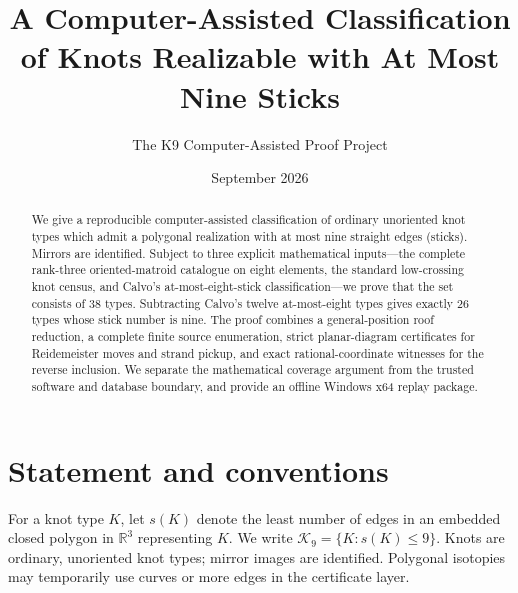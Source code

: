 \documentclass[11pt]{article}
\title{A Computer-Assisted Classification of Knots Realizable with At Most Nine Sticks}
\author{The K9 Computer-Assisted Proof Project}
\date{September 2026}
\newcommand{\K}{\mathcal K}
\begin{document}
\maketitle
\begin{abstract}
We give a reproducible computer-assisted classification of ordinary unoriented knot types which admit a polygonal realization with at most nine straight edges (sticks). Mirrors are identified. Subject to three explicit mathematical inputs---the complete rank-three oriented-matroid catalogue on eight elements, the standard low-crossing knot census, and Calvo's at-most-eight-stick classification---we prove that the set consists of 38 types. Subtracting Calvo's twelve at-most-eight types gives exactly 26 types whose stick number is nine. The proof combines a general-position roof reduction, a complete finite source enumeration, strict planar-diagram certificates for Reidemeister moves and strand pickup, and exact rational-coordinate witnesses for the reverse inclusion. We separate the mathematical coverage argument from the trusted software and database boundary, and provide an offline Windows x64 replay package.
\end{abstract}
\section{Statement and conventions}
For a knot type $K$, let $s(K)$ denote the least number of edges in an embedded closed polygon in $\mathbb R^3$ representing $K$. We write $\K_9=\{K:s(K)\leq9\}$. Knots are ordinary, unoriented knot types; mirror images are identified. Polygonal isotopies may temporarily use curves or more edges in the certificate layer.
\end{document}
